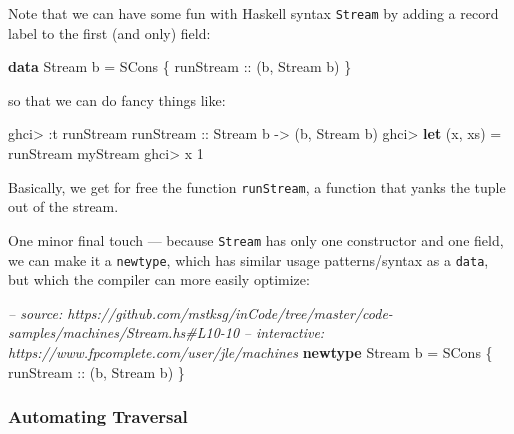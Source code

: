 \documentclass[]{article}
\newenvironment{Shaded}{}{}
\newcommand{\KeywordTok}[1]{\textcolor[rgb]{0.00,0.44,0.13}{\textbf{{#1}}}}
\newcommand{\DataTypeTok}[1]{\textcolor[rgb]{0.56,0.13,0.00}{{#1}}}
\newcommand{\DecValTok}[1]{\textcolor[rgb]{0.25,0.63,0.44}{{#1}}}
\newcommand{\CommentTok}[1]{\textcolor[rgb]{0.38,0.63,0.69}{\textit{{#1}}}}
\newcommand{\OtherTok}[1]{\textcolor[rgb]{0.00,0.44,0.13}{{#1}}}
\newcommand{\FunctionTok}[1]{\textcolor[rgb]{0.02,0.16,0.49}{{#1}}}
\newcommand{\NormalTok}[1]{{#1}}
\begin{document}
Note that we can have some fun with Haskell syntax \texttt{Stream} by
adding a record label to the first (and only) field:

\begin{Shaded}
\begin{Highlighting}[]
\KeywordTok{data} \DataTypeTok{Stream} \NormalTok{b }\FunctionTok{=} \DataTypeTok{SCons} \NormalTok{\{}\OtherTok{ runStream ::} \NormalTok{(b, }\DataTypeTok{Stream} \NormalTok{b) \}}
\end{Highlighting}
\end{Shaded}

so that we can do fancy things like:

\begin{Shaded}
\begin{Highlighting}[]
\NormalTok{ghci}\FunctionTok{>} \FunctionTok{:}\NormalTok{t runStream}
\OtherTok{runStream ::} \DataTypeTok{Stream} \NormalTok{b }\OtherTok{->} \NormalTok{(b, }\DataTypeTok{Stream} \NormalTok{b)}
\NormalTok{ghci}\FunctionTok{>} \KeywordTok{let} \NormalTok{(x, xs) }\FunctionTok{=} \NormalTok{runStream myStream}
\NormalTok{ghci}\FunctionTok{>} \NormalTok{x}
\DecValTok{1}
\end{Highlighting}
\end{Shaded}

Basically, we get for free the function \texttt{runStream}, a function
that yanks the tuple out of the stream.

One minor final touch --- because \texttt{Stream} has only one
constructor and one field, we can make it a \texttt{newtype}, which has
similar usage patterns/syntax as a \texttt{data}, but which the compiler
can more easily optimize:

\begin{Shaded}
\begin{Highlighting}[]
\CommentTok{-- source: https://github.com/mstksg/inCode/tree/master/code-samples/machines/Stream.hs#L10-10}
\CommentTok{-- interactive: https://www.fpcomplete.com/user/jle/machines}
\KeywordTok{newtype} \DataTypeTok{Stream} \NormalTok{b }\FunctionTok{=} \DataTypeTok{SCons} \NormalTok{\{}\OtherTok{ runStream ::} \NormalTok{(b, }\DataTypeTok{Stream} \NormalTok{b) \}}
\end{Highlighting}
\end{Shaded}

\subsubsection{Automating Traversal}\label{automating-traversal}
\end{document}
